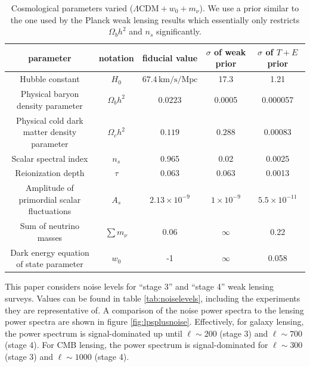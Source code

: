 \documentclass[11pt]{article} %
\begin{document}
\begin{table}[h!]
    \centering
    \scriptsize
    \begin{tabular}{|c|c|c|c|c|}
        \hline
        \textbf{parameter} & \textbf{notation} & \textbf{fiducial value} & \textbf{$\sigma$ of weak prior} & \textbf{$\sigma$ of $T + E$ prior}\\
        \hline
        Hubble constant & $H_0$ & $67.4 \, \text{km/s/Mpc}$ & 17.3 & 1.21\\
        \hline
        Physical baryon density parameter & $\Omega_b h^2$ & $0.0223$ & 0.0005 & 0.000057\\
        \hline
        Physical cold dark matter density parameter & $\Omega_c h^2$ & $0.119$ & $0.288$ & 0.00083\\
        \hline
        Scalar spectral index & $n_s$ & 0.965 & 0.02 & 0.0025 \\
        \hline
        Reionization depth & $\tau$ & 0.063 & 0.063 & 0.0013 \\
        \hline
        Amplitude of primordial scalar fluctuations & $A_s$ & $2.13 \times 10^{-9}$ & $1\times 10^{-9}$ & $5.5\times 10^{-11}$\\
        \hline
        Sum of neutrino masses & $\sum m_\nu$ & $0.06$ & $\infty$ & 0.22\\
        \hline
        Dark energy equation of state parameter & $w_0$ & -1 & $\infty$ & 0.058 \\ 
        \hline
    \end{tabular}
    \caption{Cosmological parameters varied ($\Lambda \text{CDM} + w_0 + m_\nu$). We use a prior similar to the one used by the Planck weak lensing results \cite{Planck2018Lensing} which essentially only restricts $\Omega_bh^2$ and $n_s$ significantly.}
    \label{tab:fiducialpars}
\end{table}


This paper considers noise levels for ``stage 3'' and ``stage 4'' weak lensing surveys. Values can be found in table \ref{tab:noiselevels}, including the experiments they are representative of. A comparison of the noise power spectra to the lensing power spectra are shown     in figure \ref{fig:lpsplusnoise}. Effectively, for galaxy lensing, the power spectrum is signal-dominated up until $\ell \sim 200$ (stage 3) and $\ell \sim 700$ (stage 4). For CMB lensing, the power spectrum is signal-dominated for $\ell \sim 300$ (stage 3) and $\ell \sim 1000$ (stage 4). 
\end{document}
